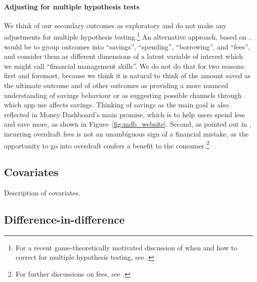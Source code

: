 \paragraph{Adjusting for multiple hypothesis tests}%
\label{par:adjusting_for_multiple_hypothesis_tests}
We think of our secondary outcomes as exploratory and do not make any
adjustments for multiple hypothesis testing.\footnote{For a recent
game-theoretically motivated discussion of when and how to correct for multiple
hypothesis testing, see \citet{viviano2021should}.} An alternative approach,
based on \citet{anderson2008multiple}, would be to group outcomes into
``savings'', ``spending'', ``borrowing'', and ``fees'', and consider them as
different dimensions of a latent variable of interest which we might call
``financial management skills''. We do not do that for two reasons: first and
foremost, because we think it is natural to think of the amount saved as the
ultimate outcome and of other outcomes as providing a more nuanced
understanding of savings behaviour or as suggesting possible channels through
which app use affects savings. Thinking of savings as the main goal is also
reflected in Money Dashboard's main promise, which is to help users spend less
and save more, as shown in Figure~\ref{fig:mdb_website}. Second, as pointed out
in \citet{carlin2017fintech}, incurring overdraft fees is not an unambiguous
sign of a financial mistake, as the opportunity to go into overdraft confers a
benefit to the consumer.\footnote{For further discussions on fees, see
\citet{jorring2020financial, stango2009consumers}.}


\subsection{Covariates}%
\label{sub:covariates}

Description of covariates.


\subsection{Difference-in-difference}%
\label{sub:difference_in_difference}

